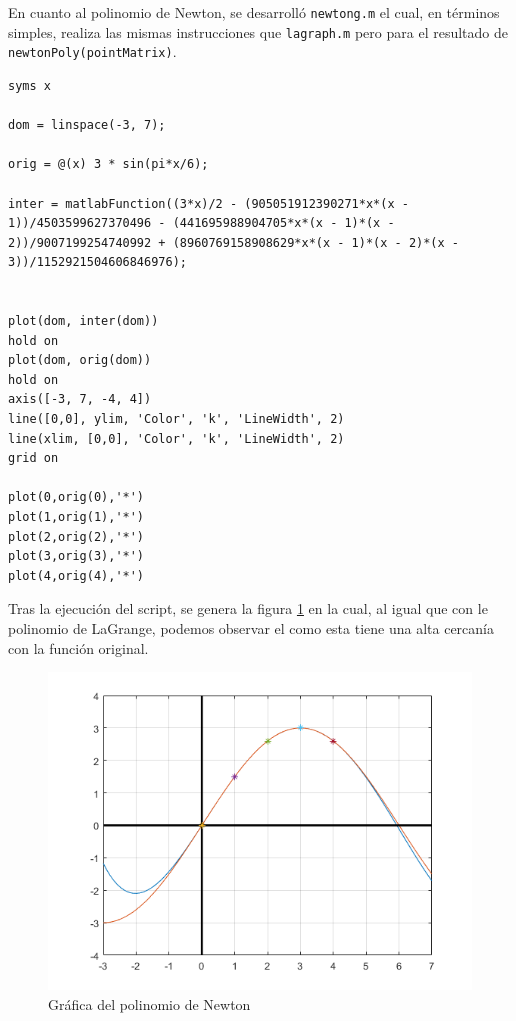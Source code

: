 \documentclass[english,notitlepage,letterpaper, 10pt]{article} %
\begin{document}
\begin{enumerate}
\begin{enumerate}
      En cuanto al polinomio de Newton, se desarrolló \texttt{newtong.m} el cual, en términos simples, realiza las mismas instrucciones que \texttt{lagraph.m} pero para el resultado de \texttt{newtonPoly(pointMatrix)}.

      \begin{lstlisting}
syms x

dom = linspace(-3, 7);

orig = @(x) 3 * sin(pi*x/6);

inter = matlabFunction((3*x)/2 - (905051912390271*x*(x - 1))/4503599627370496 - (441695988904705*x*(x - 1)*(x - 2))/9007199254740992 + (8960769158908629*x*(x - 1)*(x - 2)*(x - 3))/1152921504606846976);


plot(dom, inter(dom))
hold on
plot(dom, orig(dom))
hold on
axis([-3, 7, -4, 4])
line([0,0], ylim, 'Color', 'k', 'LineWidth', 2)
line(xlim, [0,0], 'Color', 'k', 'LineWidth', 2) 
grid on

plot(0,orig(0),'*')
plot(1,orig(1),'*')
plot(2,orig(2),'*')
plot(3,orig(3),'*')
plot(4,orig(4),'*')
      \end{lstlisting}

      Tras la ejecución del script, se genera la figura \ref{ugh} en la cual, al igual que con le polinomio de LaGrange, podemos observar el como esta tiene una alta cercanía con la función original.

      \begin{center}
        \begin{figure}[H]
          \centering
          \includegraphics{Images/newtong.png}
          \caption{Gráfica del polinomio de Newton}
          \label{ugh}
        \end{figure}
      \end{center}


\end{enumerate}
\end{enumerate}
\end{document}
